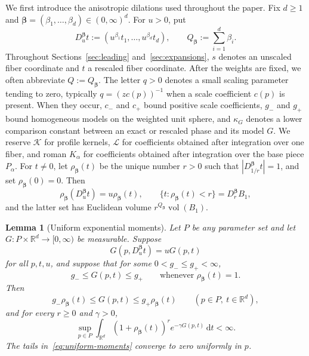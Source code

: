 \documentclass[11pt]{amsart}
\numberwithin{equation}{section}
\newtheorem{lemma}[theorem]{Lemma}
\theoremstyle{definition}
\theoremstyle{remark}
\newcommand{\R}{\mathbb{R}}
\newcommand{\dd}{\,\mathrm{d}}
\newcommand{\vol}{\operatorname{vol}}
\begin{document}
We first introduce the anisotropic dilations used throughout the paper.
Fix $d\ge1$ and $\bm\beta=(\beta_1,\ldots,\beta_d)\in(0,\infty)^d$.  For
$u>0$, put
\begin{equation}\label{eq:dilation}
  D_u^{\bm\beta}t:=(u^{\beta_1}t_1,\ldots,u^{\beta_d}t_d),
  \qquad Q_{\bm\beta}:=\sum_{i=1}^d\beta_i.
\end{equation}
Throughout Sections~\ref{sec:leading} and~\ref{sec:expansions}, $s$ denotes an
unscaled fiber coordinate and $t$ a rescaled fiber coordinate.  After the
weights are fixed, we often abbreviate $Q:=Q_{\bm\beta}$.  The letter $q>0$
denotes a small scaling parameter tending to zero, typically
$q=(zc(p))^{-1}$ when a scale coefficient $c(p)$ is present.
When they occur, $c_-$ and $c_+$ bound positive scale coefficients,
$g_-$ and $g_+$ bound homogeneous models on the weighted unit sphere, and
$\kappa_G$ denotes a lower comparison constant between an exact or rescaled
phase and its model $G$.  We reserve $\mathcal K$ for profile kernels,
$\mathcal L$ for coefficients obtained after integration over one fiber, and
roman $K_\alpha$ for coefficients obtained after integration over the base
piece $P_\alpha$.
For $t\ne0$, let $\rho_{\bm\beta}(t)$ be the unique number $r>0$ such that
$|D_{1/r}^{\bm\beta}t|=1$, and set $\rho_{\bm\beta}(0)=0$.  Then
\begin{equation}\label{eq:gauge-properties}
  \rho_{\bm\beta}(D_u^{\bm\beta}t)=u\rho_{\bm\beta}(t),
  \qquad
  \{t:\rho_{\bm\beta}(t)<r\}=D_r^{\bm\beta}B_1,
\end{equation}
and the latter set has Euclidean volume $r^{Q_{\bm\beta}}\vol(B_1)$.

\begin{lemma}[Uniform exponential moments]\label{lem:moments}
Let $P$ be any parameter set and let
$G:P\times\R^d\to[0,\infty)$ be measurable.  Suppose
\begin{equation}\label{eq:G-homogeneous}
  G(p,D_u^{\bm\beta}t)=uG(p,t)
\end{equation}
for all $p,t,u$, and suppose that for some $0<g_-\le g_+<\infty$,
\begin{equation}\label{eq:G-sphere-bounds}
  g_-\le G(p,t)\le g_+
  \qquad\text{whenever }\rho_{\bm\beta}(t)=1.
\end{equation}
Then
\begin{equation}\label{eq:G-gauge-bounds}
  g_-\rho_{\bm\beta}(t)\le G(p,t)\le g_+\rho_{\bm\beta}(t)
  \qquad(p\in P,\ t\in\R^d),
\end{equation}
and for every $r\ge0$ and $\gamma>0$,
\begin{equation}\label{eq:uniform-moments}
  \sup_{p\in P}\int_{\R^d}(1+\rho_{\bm\beta}(t))^r
  e^{-\gamma G(p,t)}\dd t<\infty.
\end{equation}
The tails in~\eqref{eq:uniform-moments} converge to zero uniformly in $p$.
\end{lemma}
\end{document}
